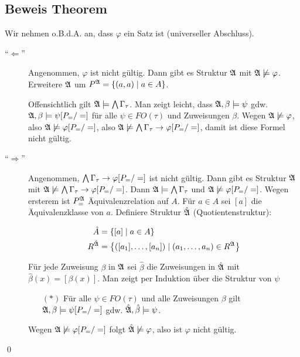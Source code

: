 \subsection{Beweis Theorem}

Wir nehmen o.B.d.A. an, dass $\varphi$ ein Satz ist (universeller Abschluss).

\begin{description}
  \item[\enquote{$\Leftarrow$}]
  Angenommen, $\varphi$ ist nicht gültig. Dann gibt es Struktur $\mathfrak{A}$
  mit $\mathfrak{A}\not\models\varphi$. Erweitere $\mathfrak{A}$ um $P^{\mathfrak{A}} =
  \left\{(a,a)\mid a\in A\right\}$.
  
  Offensichtlich gilt $\mathfrak{A}\models\operatorname*{\bigwedge}\Gamma_\tau$. Man zeigt leicht,
  dass $\mathfrak{A},\beta\models\psi$ gdw. $\mathfrak{A},\beta\models\psi[P_=/=]$ für
  alle $\psi\in FO(\tau)$ und Zuweisungen $\beta$. Wegen
  $\mathfrak{A}\not\models\varphi$, also $\mathfrak{A}\not\models\varphi[P_=/=]$, also
  $\mathfrak{A}\not\models\operatorname*{\bigwedge}\Gamma_\tau \rightarrow \varphi[P_=/=]$, damit
  ist diese Formel nicht gültig.
  
  \item[\enquote{$\Rightarrow$}]
  Angenommen, $\operatorname*{\bigwedge}\Gamma_\tau \rightarrow \varphi[P_=/=]$ ist nicht
  gültig. Dann gibt es Struktur $\mathfrak{A}$ mit $\mathfrak{A}\not\models\operatorname*{\bigwedge}
  \Gamma_\tau\rightarrow\varphi[P_=/=]$. Dann $\mathfrak{A}\models\operatorname*{\bigwedge}
  \Gamma_\tau$ und $\mathfrak{A}\not\models\varphi[P_=/=]$. Wegen ersterem ist
  $P_=^{\mathfrak{A}}$ Äquivalenzrelation auf $A$. Für $a\in A$ sei $[a]$ die
  Äquivalenzklasse von $a$. Definiere Struktur $\hat{\mathfrak{A}}$
  (Quotientenstruktur):
  
  \begin{align*}
    \hat{A} &= \left\{[a] \mid a\in A\right\}\\
    R^{\hat{\mathfrak{A}}} &= \left\{([a_1],\dots,[a_n]) \mid (a_1,\dots,a_n) \in R^{\mathfrak{A}} \right\}\\
  \end{align*}
  
  Für jede Zuweisung $\beta$ in $\mathfrak{A}$ sei $\hat{\beta}$ die
  Zuweisungen in $\hat{\mathfrak{A}}$ mit $\hat{\beta}(x)=[\beta(x)]$. Man
  zeigt per Induktion über die Struktur von $\psi$
  
  \begin{itemize}
    \item[$(*)$] Für alle $\psi\in FO(\tau)$ und alle Zuweisungen $\beta$
    gilt $\mathfrak{A},\beta\models\psi[P_=/=]$ gdw. $\hat{\mathfrak{A}},\hat{\beta}\models\psi$.
  \end{itemize}
  
  Wegen $\mathfrak{A}\not\models\varphi[P_=/=]$ folgt $\hat{\mathfrak{A}}\not\models\varphi$, also ist $\varphi$ nicht gültig.
\end{description}
\qed
